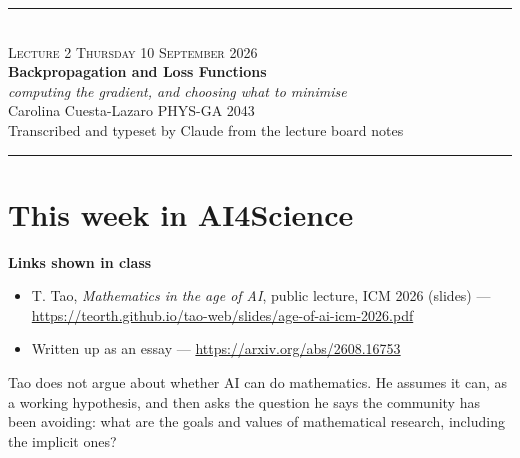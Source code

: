 \documentclass[11pt]{article}
\begin{document}
\begin{center}
{\color{accent}\rule{\textwidth}{1.2pt}}\\[9pt]
{\normalsize\color{accent}\scshape Lecture 2 \;\textbullet\; Thursday 10 September 2026}\\[8pt]
{\LARGE\bfseries Backpropagation and Loss Functions}\\[7pt]
{\large\itshape computing the gradient, and choosing what to minimise}\\[9pt]
{\normalsize Carolina Cuesta-Lazaro \;\textbullet\; PHYS-GA 2043}\\[6pt]
{\footnotesize\color{black!60} Transcribed and typeset by Claude from the lecture board notes}\\[8pt]
{\color{accent}\rule{\textwidth}{0.5pt}}
\end{center}

\vspace{0.2em}

\section{This week in AI4Science}

\begin{tcolorbox}[enhanced, colback=white, colframe=rule, boxrule=0.6pt, arc=2pt,
  left=10pt, right=10pt, top=7pt, bottom=7pt]
\small
\textbf{Links shown in class}
\begin{itemize}[leftmargin=1.2em, itemsep=1pt]
  \item T. Tao, \emph{Mathematics in the age of AI}, public lecture, ICM 2026 (slides) ---
        \url{https://teorth.github.io/tao-web/slides/age-of-ai-icm-2026.pdf}
  \item Written up as an essay --- \url{https://arxiv.org/abs/2608.16753}
\end{itemize}
\end{tcolorbox}

\noindent
Tao does not argue about whether AI can do mathematics. He assumes it can, as a working
hypothesis, and then asks the question he says the community has been avoiding: what are
the goals and values of mathematical research, including the implicit ones?
\end{document}
